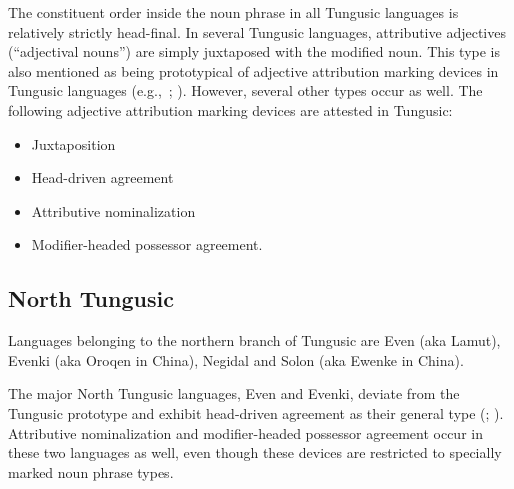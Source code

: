 The constituent order inside the noun phrase in all Tungusic languages is relatively strictly head-final. In several Tungusic languages, attributive adjectives (“adjectival nouns”) are simply juxtaposed with the modified noun. This type is also mentioned as being prototypical of adjective attribution marking devices in Tungusic languages (e.g.,~\citealt{sunik1968a}; \citealt[133]{kormusin2005}). However, several other types occur as well. The following adjective attribution marking devices are attested in Tungusic:
\begin{itemize}
\item Juxtaposition
\item Head\hyp{}driven agreement
\item Attributive nominalization
\item Modifier\hyp{}headed possessor agreement.
\end{itemize}

\subsection{North Tungusic}
Languages belonging to the northern branch of Tungusic are Even (aka Lamut), Evenki (aka Oroqen in China), Negidal and Solon (aka Ewenke in China).

The major North Tungusic languages, Even and Evenki, deviate from the Tungusic prototype and exhibit head\hyp{}driven agreement as their general type (\citealt[11]{malchukov1995}; \citealt[18]{bulatova-etal1999}). Attributive nominalization and modifier\hyp{}headed possessor agreement occur in these two languages as well, even though these devices are restricted to specially marked noun phrase types.

